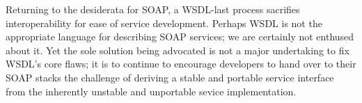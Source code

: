Returning to the desiderata for SOAP, a WSDL-last process sacrifies
interoperability for ease of service development. 
Perhaps WSDL is not the appropriate language for
describing SOAP services; we are certainly not enthused about it. Yet
the sole solution being advocated is not a major undertaking to fix
WSDL's core flaws; it is to continue to encourage developers to hand
over to their SOAP stacks the challenge of deriving a stable and portable 
service interface from the inherently unstable and unportable sevice
implementation.   
